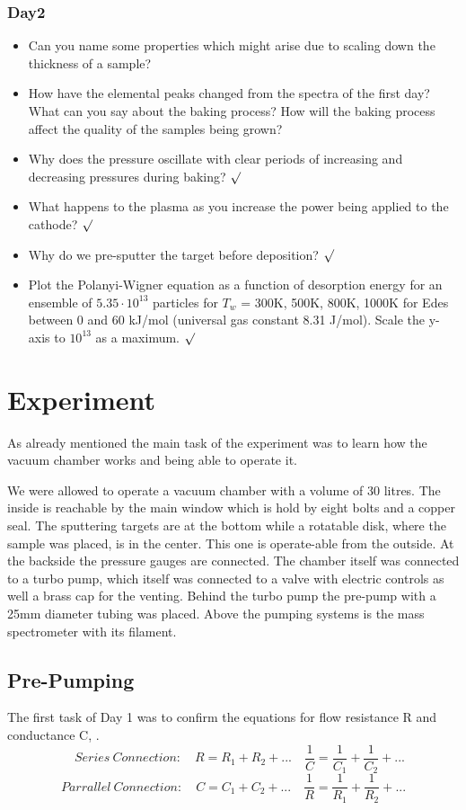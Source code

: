 \documentclass[]{article}
\begin{document}
\subsubsection{Day2}
\begin{itemize}
	 \item Can you name some properties which might arise due to scaling down the thickness of a sample?
	  \item How have the elemental peaks changed from the spectra of the ﬁrst day? What can you say about the baking process? How will the baking process affect the quality of the samples being grown? 
	  \item Why does the pressure oscillate with clear periods of increasing and decreasing pressures during baking? $\surd$
	  \item What happens to the plasma as you increase the power being applied to the cathode? $\surd$
	\item Why do we pre-sputter the target before deposition? $\surd$ 
	\item  Plot the Polanyi-Wigner equation as a function of desorption energy for an ensemble of $5.35 \cdot 10^{13}$ particles for $T_w$ = 300K, 500K, 800K, 1000K for Edes between 0 and 60 kJ/mol (universal gas constant 8.31 J/mol). Scale the y-axis to $10^{13}$ as a maximum. $\surd$
	
\end{itemize}



\newpage
\section{Experiment}
As already mentioned the main task of the experiment was to learn how the vacuum chamber works and being able to operate it. 

We were allowed to operate a vacuum chamber with a volume of 30 litres. The inside is reachable by the main window which is hold by eight bolts and a copper seal. The sputtering targets are at the bottom while a rotatable disk, where the sample was placed, is in the center. This one is operate-able from the outside. At the backside the pressure gauges are connected. 
The chamber itself was connected to a turbo pump, which itself was connected to a valve with electric controls as well a brass cap for the venting. Behind the turbo pump the pre-pump with a 25mm diameter tubing was placed. Above the pumping systems is the mass spectrometer with its filament.

\subsection{Pre-Pumping}
The first task of Day 1 was to confirm the equations for flow resistance R and conductance C, \cite[Page 91]{VacuumHandbook}. 
\[ \quad Series \: Connection: \quad
R = R_1 + R_2 + ...  \quad \frac{1}{C} = \frac{1}{C_1} + \frac{1}{C_2} + ... \]
\[ Parrallel \: Connection: \quad
C = C_1 + C_2 + ...  \quad \frac{1}{R} = \frac{1}{R_1} + \frac{1}{R_2} + ... \]
\end{document}
